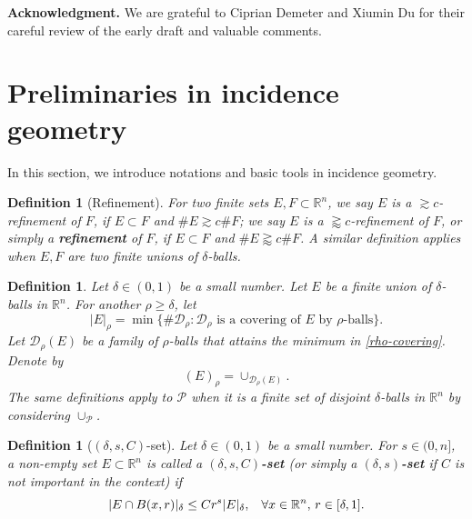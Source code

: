 \documentclass{amsart}
\numberwithin{equation}{section}
\newtheorem{definition}[theorem]{Definition}
\newcommand{\de}{\delta}
\newcommand{\cp}{\mathcal P}
\newcommand{\cd}{\mathcal D}
\newcommand{\ZR}{\mathbb{R}}
\begin{document}
\noindent
{\bf Acknowledgment.} We are grateful to Ciprian Demeter and Xiumin Du for their careful review of the early draft and valuable comments.

\bigskip


\section{Preliminaries in incidence geometry}\label{section: incidence geometry}

In this section, we introduce notations and basic tools in incidence geometry.

\begin{definition}[Refinement]
For two finite sets $E,F\subset\ZR^n$, we say $E$ is a  $\gtrsim c$-refinement of $F$, if $E\subset F$ and $\#E\gtrsim c\#F$; we say $E$ is a $\gtrapprox c$-refinement of $F$, or simply a {\bf refinement} of $F$, if $E\subset F$ and  $\#E\gtrapprox c\#F$.
A similar definition applies when $E,F$ are two finite unions of $\de$-balls.
\end{definition}

\begin{definition}
\label{E-rho}
Let $\delta\in(0,1)$ be a small number.
Let $E$ be a finite union of $\de$-balls in $\ZR^n$. 
For another $\rho\geq\de$, let
\begin{equation}
\label{rho-covering}
    |E|_\rho=\min\{\#\cd_\rho:\cd_\rho\text{ is a covering of $E$ by $\rho$-balls}\}.
\end{equation}
Let $\cd_\rho(E)$ be a family of $\rho$-balls that attains the minimum in \eqref{rho-covering}.
Denote by 
\begin{equation}
\label{E-sub-rho}
    (E)_\rho=\cup_{\cd_\rho(E)}.
\end{equation}
The same definitions apply to $\cp$ when it is a finite set of disjoint $\de$-balls in $\ZR^n$ by considering $\cup_{\cp}$.
\end{definition}



\begin{definition}[$(\de,s,C)$-set]
\label{delta-s}
Let $\delta\in(0,1)$ be a small number.
For $s\in(0,n]$, a non-empty set $E\subset \ZR^n$ is called a {\bf $(\de,s,C)$-set} (or simply a {\bf $(\de,s)$-set} if $C$ is not important in the context) if 
\begin{equation}
    |E\cap B(x,r)|_\de\leq Cr^s|E|_\de, \hspace{.3cm}\forall x \in\ZR^n, \,r\in[\de,1].
\end{equation}
\end{definition}
\end{document}
